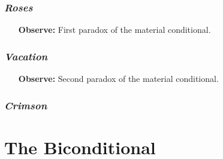 \documentclass[a4paper, 11pt]{article} %
\begin{document}
\subsubsection*{\it \textbf{Roses}}

\begin{earg}
\end{earg}


\begin{itemize}[leftmargin=1in,labelsep=.15in] %
  \item[\bf Observe:] First paradox of the material conditional.
\end{itemize}




\subsubsection*{\it \textbf{Vacation}}

\begin{earg}
\end{earg}


\begin{itemize}[leftmargin=1in,labelsep=.15in] %
  \item[\bf Observe:] Second paradox of the material conditional.
\end{itemize}







\subsubsection*{\it \textbf{Crimson}}

\begin{earg}
\end{earg}






\section*{The Biconditional}
\end{document}
